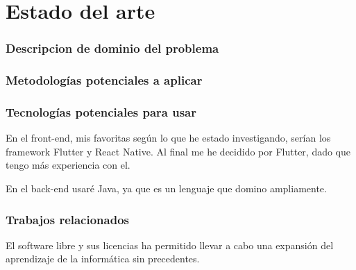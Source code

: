 \chapter{Estado del arte}
\subsection{Descripcion de dominio del problema}

\subsection{Metodologías potenciales a aplicar}
\subsection{Tecnologías potenciales para usar}
En el front-end, mis favoritas según lo que he estado investigando, serían los framework Flutter y React Native. Al final me he decidido por Flutter, dado que tengo más experiencia con el.

En el back-end usaré Java, ya que es un lenguaje que domino ampliamente.

\subsection{Trabajos relacionados}
El software libre y sus licencias \cite{gplv3} ha permitido llevar a cabo una expansión del
aprendizaje de la informática sin precedentes.
